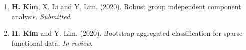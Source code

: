 \documentclass[11pt, a4paper]{awesome-cv} %
\begin{document}
%
%	
%	
%
\begin{enumerate}
	\item {\bf H. Kim}, X. Li and Y. Lim. (2020). Robust group independent component analysis. {\em Submitted}.
	\item {\bf H. Kim} and Y. Lim. (2020). Bootstrap aggregated classification for sparse functional data. {\em In review}.
\end{enumerate}




\end{document}
